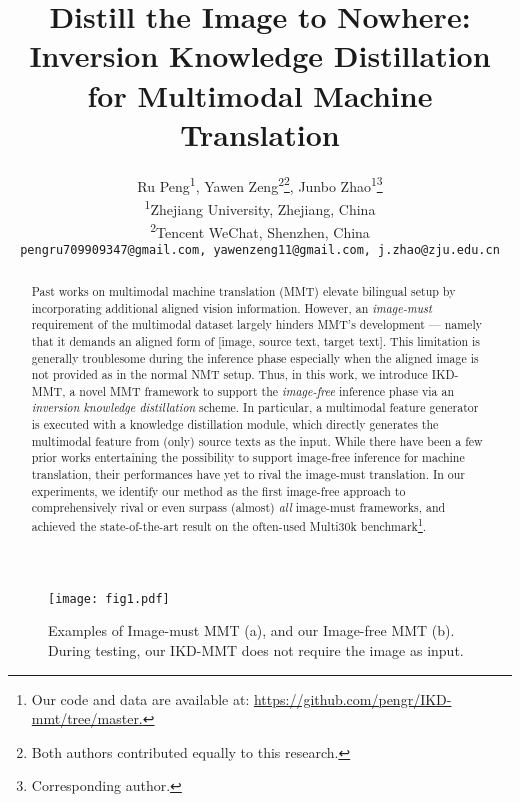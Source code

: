 \documentclass[11pt]{article}
\title{Distill the Image to Nowhere: Inversion Knowledge Distillation for Multimodal Machine Translation}
\author{Ru Peng\textsuperscript{1}, Yawen Zeng\textsuperscript{2}\thanks{Both authors contributed equally to this research.}, Junbo Zhao\textsuperscript{1}\thanks{Corresponding author.} \\
  \textsuperscript{1}Zhejiang University, Zhejiang, China \\
  \textsuperscript{2}Tencent WeChat, Shenzhen, China \\
  \texttt{pengru709909347@gmail.com, yawenzeng11@gmail.com, j.zhao@zju.edu.cn}
}
\begin{document}
\maketitle
\begin{abstract}
Past works on multimodal machine translation (MMT) elevate bilingual setup by incorporating additional aligned vision information.
However, an \emph{image-must} requirement of the multimodal dataset largely hinders MMT's development --- namely that it demands an aligned form of [image, source text, target text].
This limitation is generally troublesome during the inference phase especially when the aligned image is not provided as in the normal NMT setup.
Thus, in this work, we introduce IKD-MMT, a novel MMT framework to support the \emph{image-free} inference phase via an \emph{inversion knowledge distillation} scheme.
In particular, a multimodal feature generator is executed with a knowledge distillation module, which directly generates the multimodal feature from (only) source texts as the input.
While there have been a few prior works entertaining the possibility to support image-free inference for machine translation, their performances have yet to rival the image-must translation.
In our experiments, we identify our method as the first image-free approach to comprehensively rival or even surpass (almost) \emph{all} image-must frameworks, and achieved the state-of-the-art result on the often-used Multi30k benchmark\footnote{Our code and data are available
at: \url{https://github.com/pengr/IKD-mmt/tree/master.}}.
\end{abstract}

\begin{figure}[!t]
\centering
{\texttt{[image: fig1.pdf]}}
\centering
\caption{Examples of Image-must MMT (a), and our Image-free MMT (b). During testing, our IKD-MMT does not require the image as input.}
\label{fig:Fig1}
\end{figure}
\end{document}
